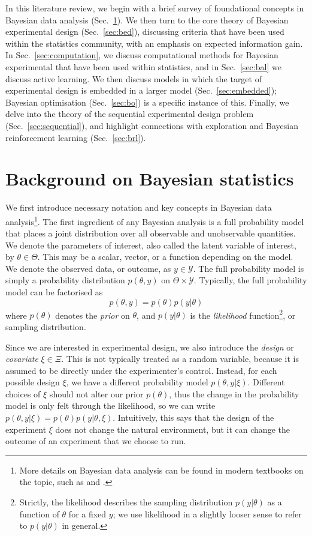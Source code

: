 \documentclass[a4paper, 10pt]{report}
\theoremstyle{plain}
\begin{document}
	In this literature review, we begin with a brief survey of foundational concepts in Bayesian data analysis (Sec.~\ref{sec:background}).
	We then turn to the core theory of Bayesian experimental design (Sec.~\ref{sec:bed}), discussing criteria that have been used within the statistics community, with an emphasis on expected information gain. In Sec.~\ref{sec:computation}, we discuss computational methods for Bayesian experimental that have been used within statistics, and in Sec.~\ref{sec:bal} we discuss active learning.
	We then discuss models in which the target of experimental design is embedded in a larger model (Sec.~\ref{sec:embedded}); Bayesian optimisation (Sec.~\ref{sec:bo}) is a specific instance of this.
	Finally, we delve into the theory of the sequential experimental design problem (Sec.~\ref{sec:sequential}), and highlight connections with exploration and Bayesian reinforcement learning (Sec.~\ref{sec:brl}).
	
	
	\section{Background on Bayesian statistics}
	\label{sec:background}
	We first introduce necessary notation and key concepts in Bayesian data analysis\footnote{More details on Bayesian data analysis can be found in modern textbooks on the topic, such as \citet{gelman2013bayesian} and \citet{kruschke2014doing}.}.
	The first ingredient of any Bayesian analysis is a full probability model that places a joint distribution over all observable and unobservable quantities. We denote the parameters of interest, also called the latent variable of interest, by $\theta\in\Theta$. This may be a scalar, vector, or a function depending on the model. We denote the observed data, or outcome, as $y\in\mathcal{Y}$. The full probability model is simply a probability distribution $p(\theta,y)$ on $\Theta \times \mathcal{Y}$. Typically, the full probability model can be factorised as
	\begin{equation}
	p(\theta,y) = p(\theta)p(y|\theta)
	\end{equation}
	where $p(\theta)$ denotes the \emph{prior} on $\theta$, and $p(y|\theta)$ is the \emph{likelihood} function\footnote{Strictly, the likelihood describes the sampling distribution $p(y|\theta)$ as a function of $\theta$ for a fixed $y$; we use likelihood in a slightly looser sense to refer to $p(y|\theta)$ in general.}, or sampling distribution.
	
	Since we are interested in experimental design, we also introduce the \emph{design} or \emph{covariate} $\xi\in\Xi$. This is not typically treated as a random variable, because it is assumed to be directly under the experimenter's control. Instead, for each possible design $\xi$, we have a different probability model $p(\theta,y|\xi)$. Different choices of $\xi$ should not alter our prior $p(\theta)$, thus the change in the probability model is only felt through the likelihood, so we can write $p(\theta,y|\xi)=p(\theta)p(y|\theta,\xi)$. 
	Intuitively, this says that the design of the experiment $\xi$ does not change the natural environment, but it can change the outcome of an experiment that we choose to run.
	
\end{document}
